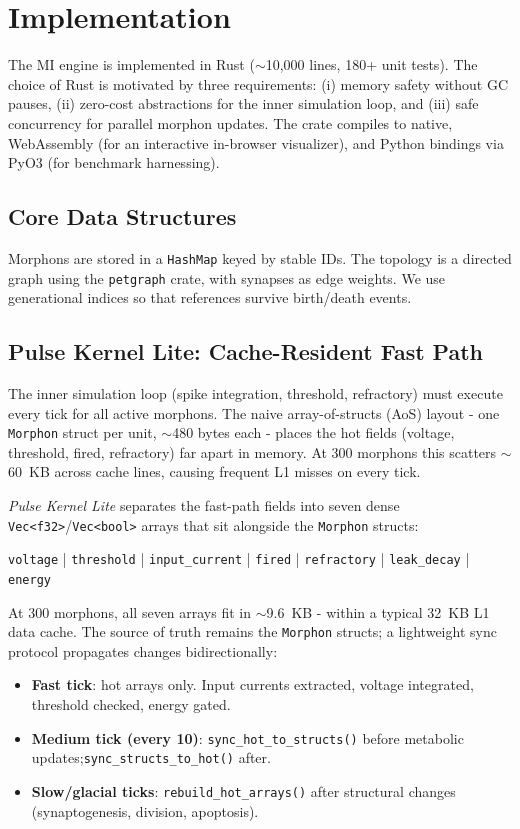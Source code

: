 \section{Implementation}
\label{sec:implementation}

The MI engine is implemented in Rust ($\sim$10,000 lines, 180+ unit tests). The choice of Rust is motivated by three requirements: (i) memory safety without GC pauses, (ii) zero-cost abstractions for the inner simulation loop, and (iii) safe concurrency for parallel morphon updates. The crate compiles to native, WebAssembly (for an interactive in-browser visualizer), and Python bindings via PyO3 (for benchmark harnessing).

\subsection{Core Data Structures}

Morphons are stored in a \texttt{HashMap} keyed by stable IDs. The topology is a directed graph using the \texttt{petgraph} crate, with synapses as edge weights. We use generational indices so that references survive birth/death events.

\subsection{Pulse Kernel Lite: Cache-Resident Fast Path}
\label{sec:pulse_kernel}

The inner simulation loop (spike integration, threshold, refractory) must execute every tick for all active morphons. The naive array-of-structs (AoS) layout - one \texttt{Morphon} struct per unit, $\sim$480 bytes each - places the hot fields (voltage, threshold, fired, refractory) far apart in memory. At 300 morphons this scatters $\sim$60~KB across cache lines, causing frequent L1 misses on every tick.

\emph{Pulse Kernel Lite} separates the fast-path fields into seven dense \texttt{Vec<f32>}/\texttt{Vec<bool>} arrays that sit alongside the \texttt{Morphon} structs:

\begin{center}
\texttt{voltage} | \texttt{threshold} | \texttt{input\_current} | \texttt{fired} | \texttt{refractory} | \texttt{leak\_decay} | \texttt{energy}
\end{center}

At 300 morphons, all seven arrays fit in $\sim$9.6~KB - within a typical 32~KB L1 data cache. The source of truth remains the \texttt{Morphon} structs; a lightweight sync protocol propagates changes bidirectionally:
\begin{itemize}
  \item \textbf{Fast tick}: hot arrays only. Input currents extracted, voltage integrated, threshold checked, energy gated.
  \item \textbf{Medium tick (every 10)}: \texttt{sync\_hot\_to\_structs()} before metabolic updates;\newline \texttt{sync\_structs\_to\_hot()} after.
  \item \textbf{Slow/glacial ticks}: \texttt{rebuild\_hot\_arrays()} after structural changes (synaptogenesis, division, apoptosis).
\end{itemize}

